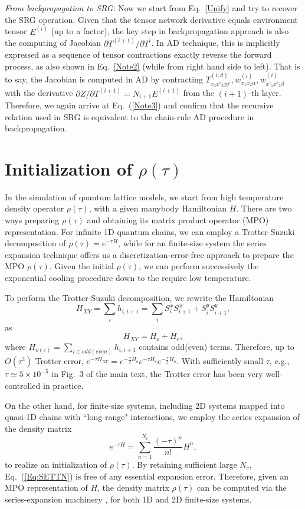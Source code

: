 \documentclass[aps,prx,twocolumn,showpacs,psfig,superscriptaddress,longbibliography]{revtex4-1}
\newcommand{\Eq}[1]{Eq.~\eqref{#1}}
\begin{document}
\textit{From backpropagation to SRG}: Now we start from \Eq{Unify} and try to recover the SRG operation. Given that the tensor network derivative equals environment tensor $E^{(i)}$ (up to a factor), the key step in backpropagation approach is also the computing of Jacobian ${\partial T^{(i+1)}}/{\partial T^{i}}$. In AD technique, this is implicitly expressed as a sequence of tensor contractions exactly reverse the forward process, as also shown in \Eq{Note2} (while from right hand side to left). That is to say, the Jacobian is computed in AD by contracting $T^{(i;d)}_{x_2x'_2jy'}, w^{(i)}_{x_1x_2\alpha}, w^{(i)}_{x'_1x'_2\beta}$ with the derivative ${\partial Z}/{\partial T^{(i+1)}} = N_{i+1} E^{(i+1)}$ from the $(i+1)$-th layer. Therefore, we again arrive at Eq.~(\ref{Note3}) and confirm that the recursive relation used in SRG is equivalent to the chain-rule AD procedure in backpropagation.

\section{Initialization of $\rho(\tau)$}
\label{App:Init}
In the simulation of quantum lattice models, we start from high temperature density operator $\rho(\tau)$, with a given manybody Hamiltonian $H$. There are two ways preparing $\rho(\tau)$ and obtaining its matrix product operator (MPO) representation. For infinite 1D quantum chains, we can employ a Trotter-Suzuki decomposition of $\rho(\tau)=e^{-\tau H}$, while for an finite-size system the series expansion technique offers us a discretization-error-free approach to prepare the MPO $\rho(\tau)$. Given the initial $\rho(\tau)$, we can perform successively the exponential cooling procedure down to the require low temperature. 

To perform the Trotter-Suzuki decomposition, we rewrite the Hamiltonian 
\begin{equation}
H_{XY} = \sum_{i} h_{i,i+1} = \sum_i S_i^x S_{i+1}^x + S_i^y S_{i+1}^y, 
\end{equation}
as
$$H_{XY} = H_o +H_e,$$ where $H_{o(e)}  = \sum_{i \in odd(even)} h_{i,i+1}$ contains odd(even) terms.
Therefore, up to $O(\tau^3)$ Trotter error, $e^{-\tau H_{XY}} = e^{-\frac{\tau}{2} H_o} e^{-\tau H_e} e^{-\frac{\tau}{2} H_o}$. With sufficiently small $\tau$, 
e.g., $\tau\simeq 5\times10^{-5}$ in Fig.~{\color{blue}3} of the main text, the Trotter error has been very well-controlled in practice.

On the other hand, for finite-size systems, including 2D systems mapped into quasi-1D chains with ``long-range" interactions,
we employ the series expansion of the density matrix
\begin{equation}
e^{-\tau H} = \sum_{n=1}^{N_c} \frac{ (-\tau)^n }{ n! } H^n,
\label{Eq:SETTN}
\end{equation} 
to realize an initialization of $\rho(\tau)$. By retaining sufficient large $N_c$, Eq.~(\ref{Eq:SETTN}) is free of any essential expansion error. 
Therefore, given an MPO representation of $H$, the density matrix $\rho(\tau)$ 
can be computed via the series-expansion machinery \cite{Chen.b+:2017:SETTN}, for both 1D and 2D finite-size systems.
\end{document}
